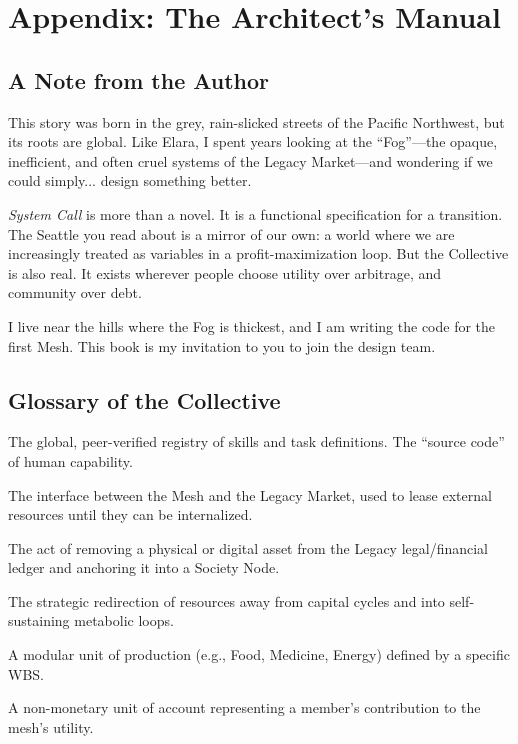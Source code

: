 
\chapter*{Appendix: The Architect's Manual}

\section*{A Note from the Author}
This story was born in the grey, rain-slicked streets of the Pacific Northwest, but its roots are global. Like Elara, I spent years looking at the ``Fog''—the opaque, inefficient, and often cruel systems of the Legacy Market—and wondering if we could simply... design something better. 

\textit{System Call} is more than a novel. It is a functional specification for a transition. The Seattle you read about is a mirror of our own: a world where we are increasingly treated as variables in a profit-maximization loop. But the Collective is also real. It exists wherever people choose utility over arbitrage, and community over debt.

I live near the hills where the Fog is thickest, and I am writing the code for the first Mesh. This book is my invitation to you to join the design team.

\section*{Glossary of the Collective}
\begin{description}[style=nextline, leftmargin=1em, font=\bfseries\headerfont\color{collectiveBlue}]
    \item[Body of Knowledge (BoK)] The global, peer-verified registry of skills and task definitions. The ``source code'' of human capability.
    \item[Common Fund] The interface between the Mesh and the Legacy Market, used to lease external resources until they can be internalized.
    \item[Dissociation] The act of removing a physical or digital asset from the Legacy legal/financial ledger and anchoring it into a Society Node.
    \item[Leaching] The strategic redirection of resources away from capital cycles and into self-sustaining metabolic loops.
    \item[Service Node] A modular unit of production (e.g., Food, Medicine, Energy) defined by a specific WBS.
    \item[Value] A non-monetary unit of account representing a member's contribution to the mesh's utility.
\end{description}

